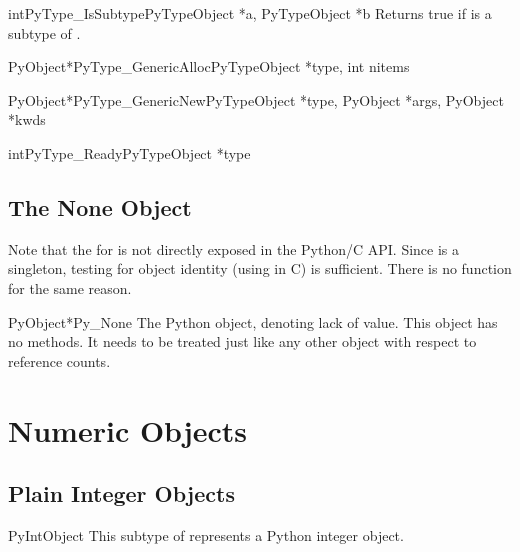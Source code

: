 \begin{cfuncdesc}{int}{PyType_IsSubtype}{PyTypeObject *a, PyTypeObject *b}
  Returns true if  is a subtype of .
\end{cfuncdesc}

\begin{cfuncdesc}{PyObject*}{PyType_GenericAlloc}{PyTypeObject *type,
                                                  int nitems}
\end{cfuncdesc}

\begin{cfuncdesc}{PyObject*}{PyType_GenericNew}{PyTypeObject *type,
                                            PyObject *args, PyObject *kwds}
\end{cfuncdesc}

\begin{cfuncdesc}{int}{PyType_Ready}{PyTypeObject *type}
\end{cfuncdesc}


\subsection{The None Object \label{noneObject}}

Note that the  for  is not directly
exposed in the Python/C API.  Since  is a singleton,
testing for object identity (using \samp{==} in C) is sufficient.
There is no  function for the same reason.

\begin{cvardesc}{PyObject*}{Py_None}
  The Python  object, denoting lack of value.  This object
  has no methods.  It needs to be treated just like any other object
  with respect to reference counts.
\end{cvardesc}


\section{Numeric Objects \label{numericObjects}}



\subsection{Plain Integer Objects \label{intObjects}}

\begin{ctypedesc}{PyIntObject}
  This subtype of  represents a Python integer
  object.
\end{ctypedesc}

